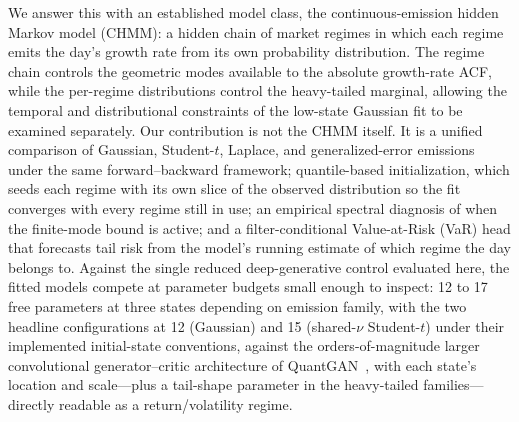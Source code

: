 We answer this with an established model class, the continuous-emission hidden Markov model (CHMM): a hidden chain of market regimes in which each regime emits the day's growth rate from its own probability distribution. The regime chain controls the geometric modes available to the absolute growth-rate ACF, while the per-regime distributions control the heavy-tailed marginal, allowing the temporal and distributional constraints of the low-state Gaussian fit to be examined separately. Our contribution is not the CHMM itself. It is a unified comparison of Gaussian, Student-$t$, Laplace, and generalized-error emissions under the same forward--backward framework; quantile-based initialization, which seeds each regime with its own slice of the observed distribution so the fit converges with every regime still in use; an empirical spectral diagnosis of when the finite-mode bound is active; and a filter-conditional Value-at-Risk (VaR) head that forecasts tail risk from the model's running estimate of which regime the day belongs to. Against the single reduced deep-generative control evaluated here, the fitted models compete at parameter budgets small enough to inspect: 12 to 17 free parameters at three states depending on emission family, with the two headline configurations at 12 (Gaussian) and 15 (shared-$\nu$ Student-$t$) under their implemented initial-state conventions, against the orders-of-magnitude larger convolutional generator--critic architecture of QuantGAN~\cite{wiese2020quantgan}, with each state's location and scale---plus a tail-shape parameter in the heavy-tailed families---directly readable as a return/volatility regime.

